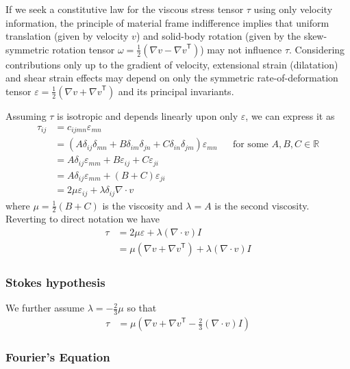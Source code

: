 \documentclass[letterpaper,11pt,nointlimits]{amsart}
\newcommand{\trans}[1]{{#1}^{\ensuremath{\mathsf{T}}}}
\begin{document}
If we seek a constitutive law for the viscous stress tensor $\tau$
using only velocity information, the principle of material frame
indifference implies that uniform translation (given by velocity $v$)
and solid-body rotation (given by the skew-symmetric rotation tensor
$\omega=\frac{1}{2}\left( \nabla{}v-\trans{\nabla{}v} \right)$)
may not influence $\tau$.  Considering contributions only up to the
gradient of velocity, extensional strain (dilatation) and shear strain
effects may depend on only the symmetric rate-of-deformation tensor
$\varepsilon=\frac{1}{2}\left( \nabla{}v+\trans{\nabla{}v}\right)$
and its principal invariants.

Assuming $\tau$ is isotropic and depends linearly upon 
only $\varepsilon$,
we can express it as
\begin{align}
\tau_{ij} 
  &= c_{ijmn} \varepsilon_{mn}
  \\
  &= \left( A \delta_{ij} \delta_{mn} 
          + B \delta_{im} \delta_{jn} 
          + C \delta_{in} \delta_{jm}
     \right) \varepsilon_{mn}
  &
  &\text{for some }A, B, C\in\mathbb{R}
  \\
  &= A \delta_{ij} \varepsilon_{mm} + B\varepsilon_{ij} + C\varepsilon_{ji}
  \\
  &= A \delta_{ij} \varepsilon_{mm} + \left( B+C \right)\varepsilon_{ji}
  \\
  &= 2 \mu \varepsilon_{ij} + \lambda\delta_{ij}\nabla\cdot{}v
\end{align}
where $\mu=\frac{1}{2}\left( B + C \right)$ is the viscosity
and $\lambda=A$ is the second viscosity.
Reverting to direct notation we have
\begin{align}
\tau 
  &= 2 \mu \varepsilon + \lambda \left( \nabla\cdot{}v \right) I
  \\
\label{eq:taunewt}
&=   \mu \left( \nabla{}v + \trans{\nabla{}v} \right) 
   + \lambda \left( \nabla\cdot{}v \right) I
\end{align}

\subsubsection{Stokes hypothesis}

We further assume $\lambda=-\frac{2}{3}\mu$ so that
\begin{align}
\tau &= \mu \left( 
    \nabla{}v + \trans{\nabla{}v} - \frac{2}{3} (\nabla\cdot{}v) I
  \right) 
\end{align}

\subsubsection{Fourier's Equation}
\end{document}
